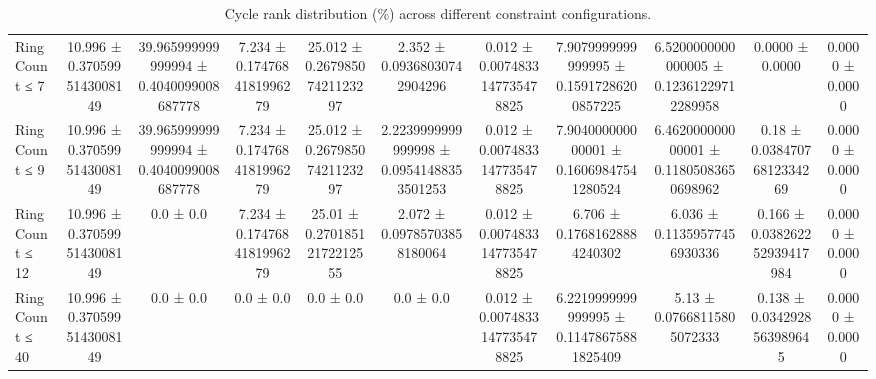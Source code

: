 \begin{table}[H]
\begin{tabular}{l c c c c c c c c c c}
        Ring Count ≤ 7 & 10.996 ± 0.3705995143008149 & 39.965999999999994 ± 0.4040099008687778 & 7.234 ± 0.1747684181996279 & 25.012 ± 0.26798507421123297 & 2.352 ± 0.09368030742904296 & 0.012 ± 0.0074833147735478825 & 7.9079999999999995 ± 0.15917286200857225 & 6.5200000000000005 ± 0.12361229712289958 & 0.0000 ± 0.0000 & 0.0000 ± 0.0000 \\
        Ring Count ≤ 9 & 10.996 ± 0.3705995143008149 & 39.965999999999994 ± 0.4040099008687778 & 7.234 ± 0.1747684181996279 & 25.012 ± 0.26798507421123297 & 2.2239999999999998 ± 0.09541488353501253 & 0.012 ± 0.0074833147735478825 & 7.904000000000001 ± 0.16069847541280524 & 6.462000000000001 ± 0.11805083650698962 & 0.18 ± 0.03847076812334269 & 0.0000 ± 0.0000 \\
        Ring Count ≤ 12 & 10.996 ± 0.3705995143008149 & 0.0 ± 0.0 & 7.234 ± 0.1747684181996279 & 25.01 ± 0.27018512172212555 & 2.072 ± 0.09785703858180064 & 0.012 ± 0.0074833147735478825 & 6.706 ± 0.17681628884240302 & 6.036 ± 0.11359577456930336 & 0.166 ± 0.038262252939417984 & 0.0000 ± 0.0000 \\
        Ring Count ≤ 40 & 10.996 ± 0.3705995143008149 & 0.0 ± 0.0 & 0.0 ± 0.0 & 0.0 ± 0.0 & 0.0 ± 0.0 & 0.012 ± 0.0074833147735478825 & 6.2219999999999995 ± 0.11478675881825409 & 5.13 ± 0.07668115805072333 & 0.138 ± 0.0342928563989645 & 0.0000 ± 0.0000 \\
        \bottomrule
    \end{tabular}
    \caption{Cycle rank distribution (\%) across different constraint configurations.}
\end{table}

